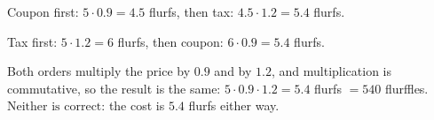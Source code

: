 Coupon first: $5\cdot0.9=4.5$ flurfs, then tax: $4.5\cdot1.2=5.4$ flurfs.

Tax first: $5\cdot1.2=6$ flurfs, then coupon: $6\cdot0.9=5.4$ flurfs.

Both orders multiply the price by $0.9$ and by $1.2$, and multiplication is commutative, so the result is the same: $5\cdot0.9\cdot1.2=5.4$ flurfs $=540$ flurffles. $\boxed{\text{Neither is correct}}$: the cost is $5.4$ flurfs either way.
